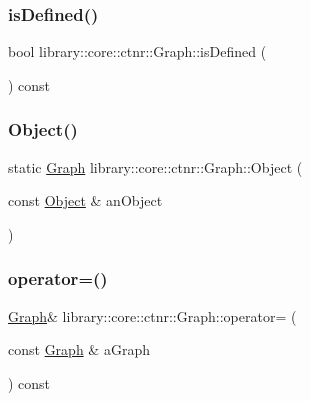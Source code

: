 \mbox{\label{classlibrary_1_1core_1_1ctnr_1_1_graph_a089dddc20bedaa9c590fca0c6e6b4677}} 
\subsubsection{\texorpdfstring{isDefined()}{isDefined()}}
{\footnotesize\ttfamily bool library\+::core\+::ctnr\+::\+Graph\+::is\+Defined (\begin{DoxyParamCaption}{ }\end{DoxyParamCaption}) const}

\mbox{\label{classlibrary_1_1core_1_1ctnr_1_1_graph_a3404e53c5dffbafad666f346d3663f0d}} 
\subsubsection{\texorpdfstring{Object()}{Object()}}
{\footnotesize\ttfamily static \mbox{\hyperlink{classlibrary_1_1core_1_1ctnr_1_1_graph}{Graph}} library\+::core\+::ctnr\+::\+Graph\+::\+Object (\begin{DoxyParamCaption}\item[{const \mbox{\hyperlink{classlibrary_1_1core_1_1ctnr_1_1_object}{Object}} \&}]{an\+Object }\end{DoxyParamCaption})\hspace{0.3cm}{\ttfamily [static]}}

\mbox{\label{classlibrary_1_1core_1_1ctnr_1_1_graph_ac31e1114997d3c6ab11df23e2bfede04}} 
\subsubsection{\texorpdfstring{operator=()}{operator=()}}
{\footnotesize\ttfamily \mbox{\hyperlink{classlibrary_1_1core_1_1ctnr_1_1_graph}{Graph}}\& library\+::core\+::ctnr\+::\+Graph\+::operator= (\begin{DoxyParamCaption}\item[{const \mbox{\hyperlink{classlibrary_1_1core_1_1ctnr_1_1_graph}{Graph}} \&}]{a\+Graph }\end{DoxyParamCaption}) const}




